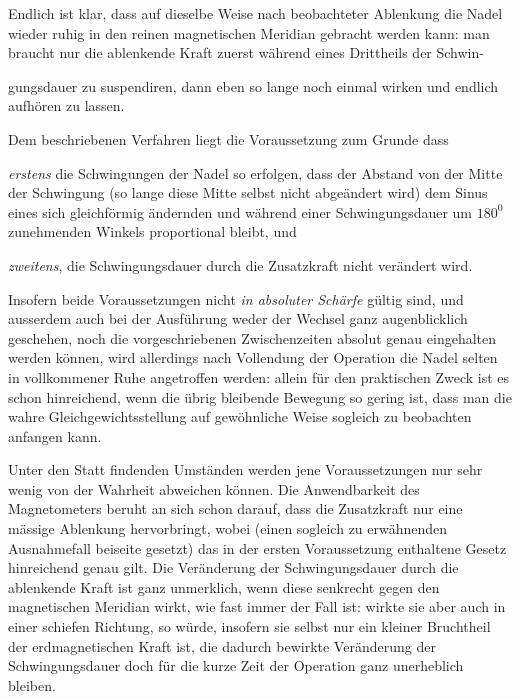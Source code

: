 Endlich ist klar, dass auf dieselbe Weise nach beobachteter Ablenkung die Nadel wieder ruhig in den reinen magnetischen Meridian gebracht werden kann: man braucht nur die ablenkende Kraft zuerst während eines Drittheils der Schwin-
\par\clearpage
{}
\noindent gungsdauer zu suspendiren, dann eben so lange noch einmal wirken und endlich aufhören zu lassen.

Dem beschriebenen Verfahren liegt die Voraussetzung zum Grunde dass

\textit{erstens} die Schwingungen der Nadel so erfolgen, dass der Abstand von der Mitte der Schwingung (so lange diese Mitte selbst nicht abgeändert wird) dem Sinus eines sich gleichförmig ändernden und während einer Schwingungsdauer um $180^0$ zunehmenden Winkels proportional bleibt, und

\textit{zweitens}, die Schwingungsdauer durch die Zusatzkraft nicht verändert wird.

Insofern beide Voraussetzungen nicht \textit{in absoluter Schärfe} gültig sind, und ausserdem auch bei der Ausführung weder der Wechsel ganz augenblicklich geschehen, noch die vorgeschriebenen Zwischenzeiten absolut genau eingehalten werden können, wird allerdings nach Vollendung der Operation die Nadel selten in vollkommener Ruhe angetroffen werden: allein für den praktischen Zweck ist es schon hinreichend, wenn die übrig bleibende Bewegung so gering ist, dass man die wahre Gleichgewichtsstellung auf gewöhnliche Weise sogleich zu beobachten anfangen kann.

Unter den Statt findenden Umständen werden jene Voraussetzungen nur sehr wenig von der Wahrheit abweichen können. Die Anwendbarkeit des Magnetometers beruht an sich schon darauf, dass die Zusatzkraft nur eine mässige Ablenkung hervorbringt, wobei (einen sogleich zu erwähnenden Ausnahmefall beiseite gesetzt) das in der ersten Voraussetzung enthaltene Gesetz hinreichend genau gilt. Die Veränderung der Schwingungsdauer durch die ablenkende Kraft ist ganz unmerklich, wenn diese senkrecht gegen den magnetischen Meridian wirkt, wie fast immer der Fall ist: wirkte sie aber auch in einer schiefen Richtung, so würde, insofern sie selbst nur ein kleiner Bruchtheil der erdmagnetischen Kraft ist, die dadurch bewirkte Veränderung der Schwingungsdauer doch für die kurze Zeit der Operation ganz unerheblich bleiben.


